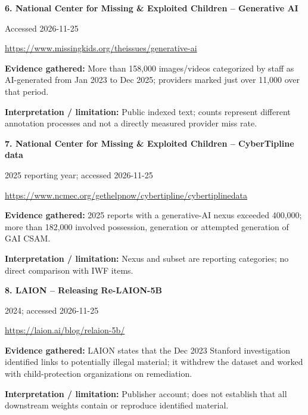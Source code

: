 \documentclass[11pt,a4paper]{article}
\begin{document}
\noindent\begin{minipage}{\linewidth}\textbf{6. National Center for Missing \& Exploited Children -- Generative AI}\par{\small Accessed 2026-11-25\par\url{https://www.missingkids.org/theissues/generative-ai}}\par
\textbf{Evidence gathered:} More than 158,000 images/videos categorized by staff as AI-generated from Jan 2023 to Dec 2025; providers marked just over 11,000 over that period.\par\textbf{Interpretation / limitation:} Public indexed text; counts represent different annotation processes and not a directly measured provider miss rate.\par
\end{minipage}\par\vspace{2mm}
\noindent\begin{minipage}{\linewidth}\textbf{7. National Center for Missing \& Exploited Children -- CyberTipline data}\par{\small 2025 reporting year; accessed 2026-11-25\par\url{https://www.ncmec.org/gethelpnow/cybertipline/cybertiplinedata}}\par
\textbf{Evidence gathered:} 2025 reports with a generative-AI nexus exceeded 400,000; more than 182,000 involved possession, generation or attempted generation of GAI CSAM.\par\textbf{Interpretation / limitation:} Nexus and subset are reporting categories; no direct comparison with IWF items.\par
\end{minipage}\par\vspace{2mm}
\noindent\begin{minipage}{\linewidth}\textbf{8. LAION -- Releasing Re-LAION-5B}\par{\small 2024; accessed 2026-11-25\par\url{https://laion.ai/blog/relaion-5b/}}\par
\textbf{Evidence gathered:} LAION states that the Dec 2023 Stanford investigation identified links to potentially illegal material; it withdrew the dataset and worked with child-protection organizations on remediation.\par\textbf{Interpretation / limitation:} Publisher account; does not establish that all downstream weights contain or reproduce identified material.\par
\end{minipage}\par\vspace{2mm}
\end{document}
